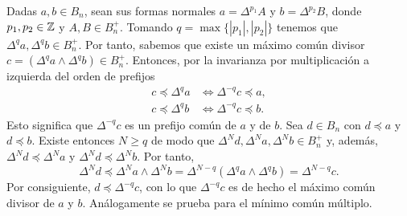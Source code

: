 \documentclass[TFG.tex]{subfiles}
\begin{document}
Dadas $a,b\in B_n$, sean sus formas normales $a=\Delta^{p_1}A$ y $b=\Delta^{p_2}B$, donde $p_1,p_2\in\mathbb{Z}$ y $A,B\in B_n^+$. Tomando $q=\max\{|p_1|,|p_2|\}$ tenemos que $\Delta^qa,\Delta^qb\in B_n^+$. Por tanto, sabemos que existe un máximo común divisor $c=(\Delta^qa\land\Delta^qb)\in B_n^+$. Entonces, por la invarianza por multiplicación a izquierda del orden de prefijos
\begin{align*}
c\preccurlyeq \Delta^qa &\Leftrightarrow\Delta^{-q}c\preccurlyeq a,\\
c\preccurlyeq \Delta^qb &\Leftrightarrow\Delta^{-q}c\preccurlyeq b.
\end{align*}
Esto significa que $\Delta^{-q}c$ es un prefijo común de $a$ y de $b$. Sea $d\in B_n$ con $d\preccurlyeq a$ y $d\preccurlyeq b$. Existe entonces $N\geq q$ de modo que $\Delta^N d, \Delta^Na, \Delta^N b\in B_n^+$ y, además, $\Delta^N d \preccurlyeq\Delta^Na$ y $\Delta^N d \preccurlyeq\Delta^Nb$. Por tanto, 
$$\Delta^Nd\preccurlyeq \Delta^N a\land\Delta^N b=\Delta^{N-q}(\Delta^qa\land \Delta^qb)=\Delta^{N-q}c.$$
Por consiguiente, $d\preccurlyeq \Delta^{-q}c$, con lo que $\Delta^{-q}c$ es de hecho el máximo común divisor de $a$ y $b$. Análogamente se prueba para el mínimo común múltiplo. 


\end{document}
